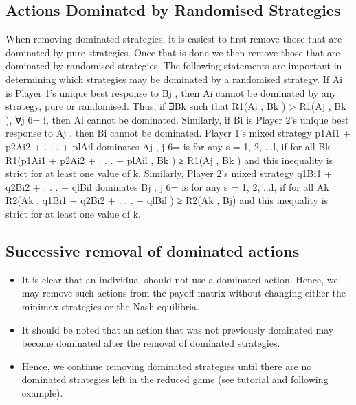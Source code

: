 \documentclass[]{report}
\begin{document}
\subsection{Actions Dominated by Randomised Strategies}
When removing dominated strategies, it is easiest to first remove
those that are dominated by pure strategies.
Once that is done we then remove those that are dominated by
randomised strategies.
The following statements are important in determining which
strategies may be dominated by a randomised strategy.
If Ai
is Player 1’s unique best response to Bj
, then Ai cannot be
dominated by any strategy, pure or randomised.
Thus, if ∃Bk such that R1(Ai
, Bk ) > R1(Aj
, Bk ), ∀j 6= i, then Ai
cannot be dominated.
Similarly, if Bi
is Player 2’s unique best response to Aj
, then Bi
cannot be dominated.
Player 1’s mixed strategy p1Ai1 + p2Ai2 + . . . + plAil
dominates Aj
,
j 6= is for any s = 1, 2, ...l, if for all Bk
R1(p1Ai1 + p2Ai2 + . . . + plAil
, Bk ) ≥ R1(Aj
, Bk )
and this inequality is strict for at least one value of k.
Similarly, Player 2’s mixed strategy q1Bi1 + q2Bi2 + . . . + qlBil
dominates Bj
, j 6= is for any s = 1, 2, ...l, if for all Ak
R2(Ak , q1Bi1 + q2Bi2 + . . . + qlBil
) ≥ R2(Ak , Bj)
and this inequality is strict for at least one value of k.
\subsection{Successive removal of dominated actions}
\begin{itemize}
	\item It is clear that an individual should not use a dominated action.
	Hence, we may remove such actions from the payoff matrix without
	changing either the minimax strategies or the Nash equilibria.
\item	It should be noted that an action that was not previously
	dominated may become dominated after the removal of dominated
	strategies.
\item Hence, we continue removing dominated strategies until there are
	no dominated strategies left in the reduced game (see tutorial and
	following example).
\end{itemize}

\end{document}
